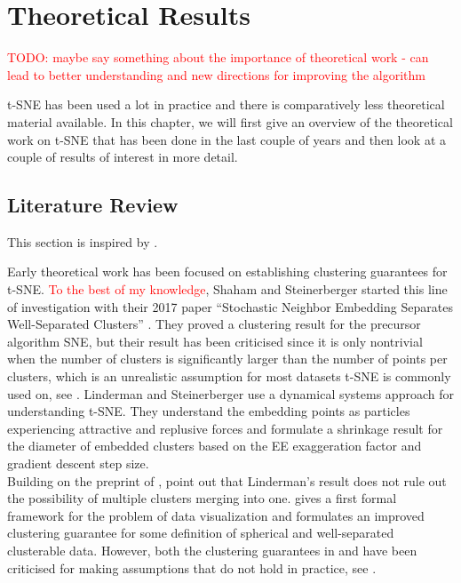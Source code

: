 \chapter{Theoretical Results}\label{chapter:theoretical_results}
\textcolor{red}{TODO: maybe say something about the importance of theoretical work - can lead to better understanding and new directions for improving the algorithm}

t-SNE has been used a lot in practice and there is comparatively less theoretical material available. 
In this chapter, we will first give an overview of the theoretical work on t-SNE that has been done in the last couple of years and then look at a couple of results of interest in more detail. 

\section{Literature Review}
This section is inspired by \cite{murray2024largedatalimitsscaling}. 

Early theoretical work has been focused on establishing clustering guarantees for t-SNE. 
\textcolor{red}{To the best of my knowledge}, Shaham and Steinerberger started this line of investigation with their 2017 paper \enquote{Stochastic Neighbor Embedding Separates Well-Separated Clusters} \cite{shaham17}. 
They proved a clustering result for the precursor algorithm SNE, but their result has been criticised since it is only nontrivial when the number of clusters is significantly larger than the number of points per clusters, which is an unrealistic assumption for most datasets t-SNE is commonly used on, see \cite{Arora18}.  
Linderman and Steinerberger \cite{LinStei22} use a dynamical systems approach for understanding t-SNE. 
They understand the embedding points as particles experiencing attractive and replusive forces and formulate a shrinkage result for the diameter of embedded clusters based on the EE exaggeration factor and gradient descent step size. \\
Building on the preprint of \cite{LinStei22}, \cite{Arora18} point out that Linderman's result does not rule out the possibility of multiple clusters merging into one. 
\cite{Arora18} gives a first formal framework for the problem of data visualization and formulates an improved clustering guarantee for some definition of spherical and well-separated clusterable data. 
However, both the clustering guarantees in \cite{Arora18} and \cite{LinStei22} have been criticised for making assumptions that do not hold in practice, see \cite{yang2021tsneoptimizedrevealclusters}. 


